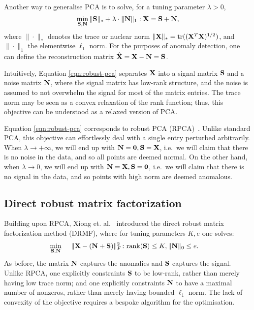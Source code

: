 Another way to generalise PCA is to solve, for a tuning parameter $\lambda > 0$,
\begin{equation}
	\label{eqn:robust-pca}
	\min_{\S, \N} \| \S \|_* + \lambda \cdot \| \N \|_1 : \X = \S + \N,
\end{equation}
where $\| \cdot \|_*$ denotes the trace or nuclear norm $\| \X \|_* = \mathrm{tr}( (\X^T \X)^{1/2} )$,
and $\| \cdot \|_1$ the elementwise $\ell_1$ norm.
For the purposes of anomaly detection, one can define the reconstruction matrix $\hat{\X} = \X - \N = \S$.

Intuitively, Equation \ref{eqn:robust-pca} separates $\X$ into a signal matrix $\S$ and a noise matrix $\N$,
where the signal matrix has low-rank structure, and the noise is assumed to not overwhelm the signal for most of the matrix entries.
The trace norm may be seen as a convex relaxation of the rank function;
thus, this objective can be understood as a relaxed version of PCA.

Equation \ref{eqn:robust-pca} corresponds to robust PCA (RPCA)~\cite{candes2010robust}.
Unlike standard PCA, this objective can effortlessly deal with a single entry perturbed arbitrarily.
When $\lambda \to +\infty$, we will end up with $\N = \mathbf{0}, \S = \X$,
i.e.\, we will claim that there is no noise in the data, and so all points are deemed normal.
On the other hand, when $\lambda \to 0$, we will end up with $\N = \X, \S = \mathbf{0}$,
i.e.\, we will claim that there is no signal in the data, and so points with high norm are deemed anomalous.


%
\subsection{Direct robust matrix factorization}

Building upon RPCA,
Xiong et. al.~\cite{xiong2011direct} introduced the direct robust matrix factorization method (DRMF),
where for tuning parameters $K, e$ one solves:
\begin{equation}
	\label{eqn:drmf}
	\begin{aligned}
	\min_{\S, \N} \hspace{0.5cm} & \| \X - (\N + \S) \|_{F}^2 \colon \mbox{rank}(\S) \leq K, \|\N\|_{0} \leq e.
	\end{aligned}
\end{equation}
As before, the matrix $\N$ captures the anomalies and $\S$ captures the signal.
Unlike RPCA, one explicitly constraints $\S$ to be low-rank, rather than merely having low trace norm;
and one explicitly constraints $\N$ to have a maximal number of nonzeros, rather than merely having bounded $\ell_1$ norm.
The lack of convexity of the objective requires a bespoke algorithm for the optimisation.


